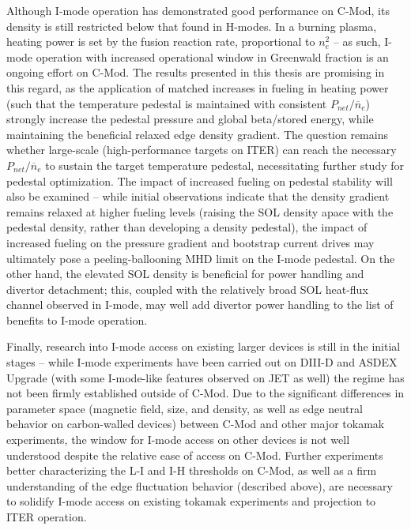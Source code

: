 Although I-mode operation has demonstrated good performance on C-Mod, its density is still restricted below that found in H-modes.  In a burning plasma, heating power is set by the fusion reaction rate, proportional to $n_e^2$ -- as such, I-mode operation with increased operational window in Greenwald fraction is an ongoing effort on C-Mod.  The results presented in this thesis are promising in this regard, as the application of matched increases in fueling in heating power (such that the temperature pedestal is maintained with consistent $P_{net}/\overline{n}_e$) strongly increase the pedestal pressure and global beta/stored energy, while maintaining the beneficial relaxed edge density gradient.  The question remains whether large-scale (\eg high-performance targets on ITER) can reach the necessary $P_{net}/\overline{n}_e$ to sustain the target temperature pedestal, necessitating further study for pedestal optimization.  The impact of increased fueling on pedestal stability will also be examined -- while initial observations indicate that the density gradient remains relaxed at higher fueling levels (raising the SOL density apace with the pedestal density, rather than developing a density pedestal), the impact of increased fueling on the pressure gradient and bootstrap current drives may ultimately pose a peeling-ballooning MHD limit on the I-mode pedestal.  On the other hand, the elevated SOL density is beneficial for power handling and divertor detachment; this, coupled with the relatively broad SOL heat-flux channel observed in I-mode, may well add divertor power handling to the list of benefits to I-mode operation.

Finally, research into I-mode access on existing larger devices is still in the initial stages -- while I-mode experiments have been carried out on DIII-D and ASDEX Upgrade (with some I-mode-like features observed on JET as well) the regime has not been firmly established outside of C-Mod.  Due to the significant differences in parameter space (magnetic field, size, and density, as well as edge neutral behavior on carbon-walled devices) between C-Mod and other major tokamak experiments, the window for I-mode access on other devices is not well understood despite the relative ease of access on C-Mod.  Further experiments better characterizing the L-I and I-H thresholds on C-Mod, as well as a firm understanding of the edge fluctuation behavior (described above), are necessary to solidify I-mode access on existing tokamak experiments and projection to ITER operation.\nicechapterending


